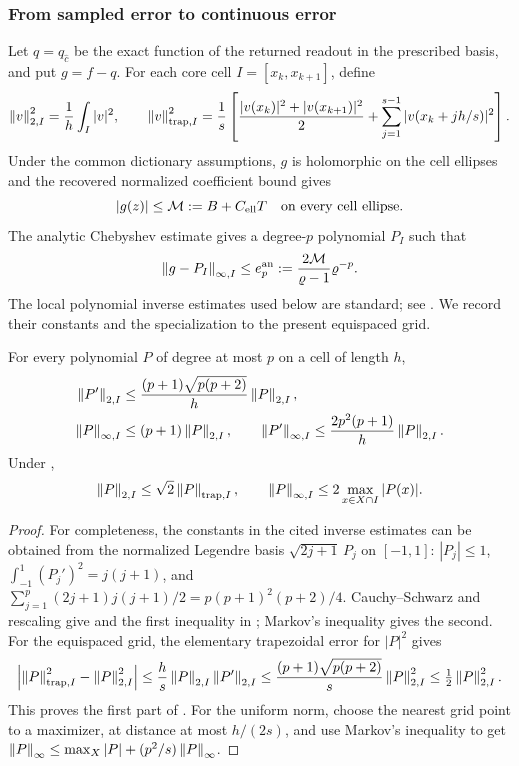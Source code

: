 \subsubsection{From sampled error to continuous error}
\label{sec:continuous}
Let $q=q_{\widehat c}$ be the exact function of the returned readout in the
prescribed basis, and put $g=f-q$. For each core cell $I=[x_k,x_{k+1}]$, define
\[
 \left\lVert v\right\rVert_{2,I}^2=\frac1h\int_I|v|^2,\qquad
 \left\lVert v\right\rVert_{\mathrm{trap},I}^2=
 \frac1s\left[\frac{|v(x_k)|^2+|v(x_{k+1})|^2}2
          +\sum_{j=1}^{s-1}|v(x_k+jh/s)|^2\right].
\]
Under the common dictionary assumptions, $g$ is holomorphic on the cell
ellipses and the recovered normalized coefficient bound gives
\begin{equation}
 |g(z)|\le\mathcal M:=B+C_{\rm ell}T
 \quad\text{on every cell ellipse}.
 \label{eq:gellipse}
\end{equation}
The analytic Chebyshev estimate \cite[Ch.~8]{trefethen2019atap} gives a
degree-$p$ polynomial $P_I$ such that
\begin{equation}
 \left\lVert g-P_I\right\rVert_{\infty,I}\le e_p^{\rm an}
 :=\frac{2\mathcal M}{\varrho-1}\varrho^{-p}.
 \label{eq:ep}
\end{equation}
The local polynomial inverse estimates used below are standard; see
\cite[Secs.~5.4.1 and 5.4.4]{Canuto2006Spectral}. We record their constants
and the specialization to the present equispaced grid.

\begin{lemma}
\label{lem:poly-sampling}
For every polynomial $P$ of degree at most $p$ on a cell of length $h$,
\begin{align}
 \left\lVert P'\right\rVert_{2,I}&\le\frac{(p+1)\sqrt{p(p+2)}}h\left\lVert P\right\rVert_{2,I},
 \label{eq:legendre-inverse}\\
 \left\lVert P\right\rVert_{\infty,I}&\le(p+1)\left\lVert P\right\rVert_{2,I},\qquad
 \left\lVert P'\right\rVert_{\infty,I}\le\frac{2p^2(p+1)}h\left\lVert P\right\rVert_{2,I}.
 \label{eq:linfty-inverse}
\end{align}
Under ,
\begin{equation}
 \left\lVert P\right\rVert_{2,I}\le\sqrt2\left\lVert P\right\rVert_{\mathrm{trap},I},\qquad
 \left\lVert P\right\rVert_{\infty,I}\le2\max_{x\in X\cap I}|P(x)|.
 \label{eq:P-trap}
\end{equation}
\end{lemma}
\begin{proof}
For completeness, the constants in the cited inverse estimates can be
obtained from the normalized Legendre basis
$\sqrt{2j+1}\,P_j$ on $[-1,1]$:
$|P_j|\le1$, $\int_{-1}^1(P_j')^2=j(j+1)$, and
$\sum_{j=1}^p(2j+1)j(j+1)/2=p(p+1)^2(p+2)/4$.
Cauchy--Schwarz and rescaling give  and the first
inequality in ; Markov's inequality gives the second.
For the equispaced grid, the elementary trapezoidal error for $|P|^2$ gives
\[
 \left|\left\lVert P\right\rVert_{\mathrm{trap},I}^2-\left\lVert P\right\rVert_{2,I}^2\right|
 \le\frac hs\left\lVert P\right\rVert_{2,I}\left\lVert P'\right\rVert_{2,I}
 \le\frac{(p+1)\sqrt{p(p+2)}}s\left\lVert P\right\rVert_{2,I}^2
 \le\tfrac12\left\lVert P\right\rVert_{2,I}^2.
\]
This proves the first part of . For the uniform norm,
choose the nearest grid point to a maximizer, at distance at most $h/(2s)$,
and use Markov's inequality to get
$\left\lVert P\right\rVert_\infty\le\max_X|P|+(p^2/s)\left\lVert P\right\rVert_\infty$.
\end{proof}

